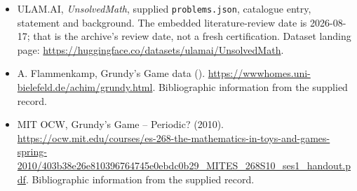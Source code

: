 \documentclass[11pt,a4paper]{article}
\begin{document}
{\small

\begin{itemize}

\item[\hypertarget{source:statement:1}{S1}] ULAM.AI, \emph{UnsolvedMath}, supplied \texttt{problems.json}, catalogue entry, statement and background. The embedded literature-review date is 2026-08-17; that is the archive’s review date, not a fresh certification. Dataset landing page: \url{https://huggingface.co/datasets/ulamai/UnsolvedMath}.

\item[\hypertarget{source:statement:2}{S2}] A. Flammenkamp, Grundy's Game data (). \url{https://wwwhomes.uni-bielefeld.de/achim/grundy.html}. Bibliographic information from the supplied record.

\item[\hypertarget{source:statement:3}{S3}] MIT OCW, Grundy's Game -- Periodic? (2010). \url{https://ocw.mit.edu/courses/es-268-the-mathematics-in-toys-and-games-spring-2010/403b38e26e810396764745e0ebdc0b29_MITES_268S10_ses1_handout.pdf}. Bibliographic information from the supplied record.

\end{itemize}

}

\label{end:statement}
\end{document}
